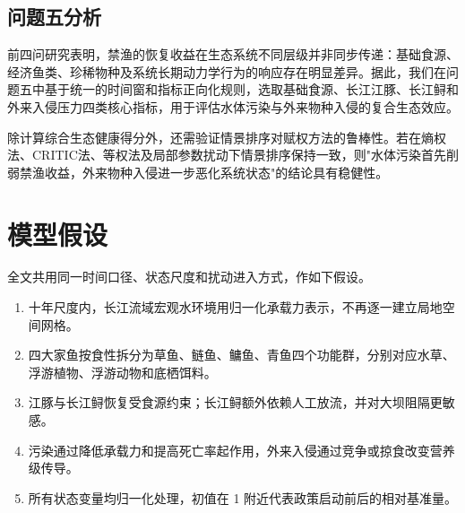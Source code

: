 \documentclass{MMCStyle}
\begin{document}
\subsection{问题五分析}
前四问研究表明，禁渔的恢复收益在生态系统不同层级并非同步传递：基础食源、经济鱼类、珍稀物种及系统长期动力学行为的响应存在明显差异。据此，我们在问题五中基于统一的时间窗和指标正向化规则，选取基础食源、长江江豚、长江鲟和外来入侵压力四类核心指标，用于评估水体污染与外来物种入侵的复合生态效应。

除计算综合生态健康得分外，还需验证情景排序对赋权方法的鲁棒性。若在熵权法、CRITIC法、等权法及局部参数扰动下情景排序保持一致，则"水体污染首先削弱禁渔收益，外来物种入侵进一步恶化系统状态"的结论具有稳健性。

\section{模型假设}
全文共用同一时间口径、状态尺度和扰动进入方式，作如下假设。
\begin{enumerate}
\item 十年尺度内，长江流域宏观水环境用归一化承载力表示，不再逐一建立局地空间网格。
\item 四大家鱼按食性拆分为草鱼、鲢鱼、鳙鱼、青鱼四个功能群，分别对应水草、浮游植物、浮游动物和底栖饵料。
\item 江豚与长江鲟恢复受食源约束；长江鲟额外依赖人工放流，并对大坝阻隔更敏感。
\item 污染通过降低承载力和提高死亡率起作用，外来入侵通过竞争或掠食改变营养级传导。
\item 所有状态变量均归一化处理，初值在 1 附近代表政策启动前后的相对基准量。
\end{enumerate}
\end{document}
